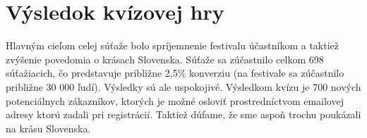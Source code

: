 \documentclass[10pt,twoside,slovak,a4paper]{article}
\begin{document}
\section{Výsledok kvízovej hry}

Hlavným cieľom celej súťaže bolo spríjemnenie festivalu účastníkom a taktiež zvýšenie povedomia o krásach Slovenska. Súťaže sa zúčastnilo celkom 698 súťažiacich, čo predstavuje približne 2,5\% konverziu (na festivale sa zúčastnilo približne 30 000 ľudí). Výsledky sú ale uspokojivé. Výsledkom kvízu je 700 nových potenciálnych zákazníkov, ktorých je možné osloviť prostredníctvom emailovej adresy ktorú zadali pri registrácií. Taktiež dúfame, že sme aspoň trochu poukázali na krásu Slovenska.


 
\end{document}
